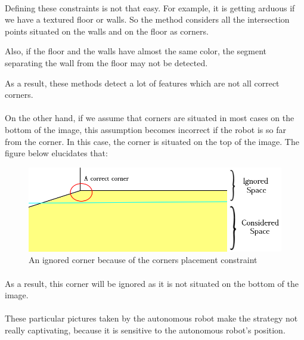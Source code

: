 \documentclass[12pt]{report}
\begin{document}
	 \paragraph{}
	 Defining these constraints is not that easy. For example, it is getting arduous if we have a textured floor or walls. So the method considers all the intersection points situated on the walls and on the floor as corners. 
	
	 Also, if the floor and the walls have almost the same color, the segment separating the wall from the floor may not be detected.
	 
	 As a result, these methods detect a lot of features which are not all correct corners.
	 
	 \paragraph{}
	 On the other hand, if we assume that corners are situated in most cases on the bottom of the image, this assumption becomes incorrect if the robot is so far from the corner. In this case, the corner is situated on the top of the image. The figure below elucidates that:
	 	\begin{figure}[H]
	 	\begin{center}
	 		\includegraphics[scale=0.6]{res/start1_c1.png}
	 		\caption{An ignored corner because of the corners placement constraint}
	 	\end{center}
	 \end{figure}
	 \paragraph{}
	 As a result, this corner will be ignored as it is not situated on the bottom of the image.
	 
	 \paragraph{}
	 These particular pictures taken by the autonomous robot make the strategy not really captivating, because it is sensitive to the autonomous robot's position.
	 
\end{document}
